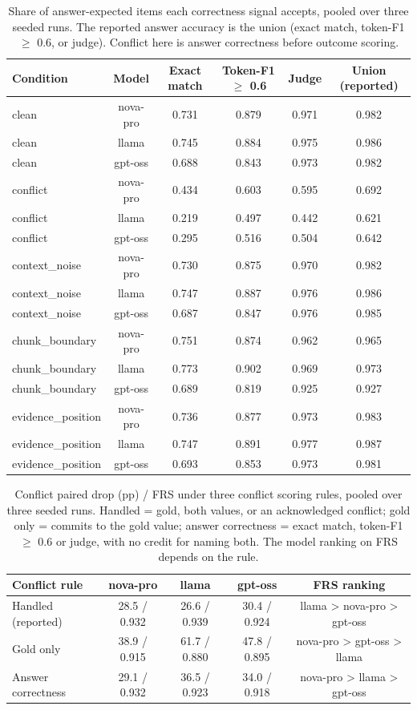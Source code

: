 \begin{table}[t]
\centering\small
\caption{Share of answer-expected items each correctness signal accepts, pooled over three seeded runs. The reported answer accuracy is the union (exact match, token-F1 $\geq$ 0.6, or judge). Conflict here is answer correctness before outcome scoring.}
\begin{tabular}{lccccc}
\toprule
Condition & Model & Exact match & Token-F1 $\geq$ 0.6 & Judge & Union (reported) \\
\midrule
clean & nova-pro & 0.731 & 0.879 & 0.971 & 0.982 \\
clean & llama & 0.745 & 0.884 & 0.975 & 0.986 \\
clean & gpt-oss & 0.688 & 0.843 & 0.973 & 0.982 \\
conflict & nova-pro & 0.434 & 0.603 & 0.595 & 0.692 \\
conflict & llama & 0.219 & 0.497 & 0.442 & 0.621 \\
conflict & gpt-oss & 0.295 & 0.516 & 0.504 & 0.642 \\
context\_noise & nova-pro & 0.730 & 0.875 & 0.970 & 0.982 \\
context\_noise & llama & 0.747 & 0.887 & 0.976 & 0.986 \\
context\_noise & gpt-oss & 0.687 & 0.847 & 0.976 & 0.985 \\
chunk\_boundary & nova-pro & 0.751 & 0.874 & 0.962 & 0.965 \\
chunk\_boundary & llama & 0.773 & 0.902 & 0.969 & 0.973 \\
chunk\_boundary & gpt-oss & 0.689 & 0.819 & 0.925 & 0.927 \\
evidence\_position & nova-pro & 0.736 & 0.877 & 0.973 & 0.983 \\
evidence\_position & llama & 0.747 & 0.891 & 0.977 & 0.987 \\
evidence\_position & gpt-oss & 0.693 & 0.853 & 0.973 & 0.981 \\
\bottomrule
\end{tabular}
\end{table}

\begin{table}[t]
\centering\small
\caption{Conflict paired drop (pp) / FRS under three conflict scoring rules, pooled over three seeded runs. Handled = gold, both values, or an acknowledged conflict; gold only = commits to the gold value; answer correctness = exact match, token-F1 $\geq$ 0.6 or judge, with no credit for naming both. The model ranking on FRS depends on the rule.}
\begin{tabular}{lcccc}
\toprule
Conflict rule & nova-pro & llama & gpt-oss & FRS ranking \\
\midrule
Handled (reported) & 28.5 / 0.932 & 26.6 / 0.939 & 30.4 / 0.924 & llama > nova-pro > gpt-oss \\
Gold only & 38.9 / 0.915 & 61.7 / 0.880 & 47.8 / 0.895 & nova-pro > gpt-oss > llama \\
Answer correctness & 29.1 / 0.932 & 36.5 / 0.923 & 34.0 / 0.918 & nova-pro > llama > gpt-oss \\
\bottomrule
\end{tabular}
\end{table}
